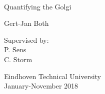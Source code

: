 \documentclass{Dissertate}
\date{}
\begin{document}
\begin{titlepage}
​    \begin{center}

        
        \vspace*{2.5cm}
        
        \huge
        Quantifying the Golgi
        
        \vspace{1.5cm}
        
        \Large
        Gert-Jan Both
    
        \vspace{1.5cm}
    
        
        \vfill
        
        \normalsize
        Supervised by:\\
        P. Sens\\
        C. Storm
    
        \vspace{0.8cm}
    
        
        \normalsize
        Eindhoven Technical University\\
        January-November 2018
    
    
    \end{center}
\end{titlepage}
\end{document}
